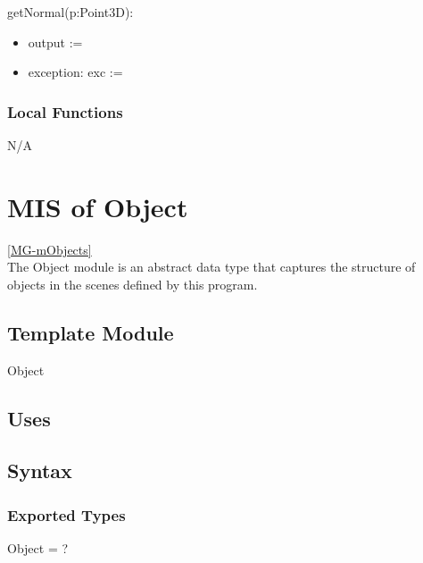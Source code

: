 \documentclass[12pt, titlepage]{article}
\begin{document}
\noindent getNormal(p:Point3D):
\begin{itemize}
	\item output := 
	\item exception: exc :=
\end{itemize}


\subsubsection{Local Functions}
N/A

\newpage

\section{MIS of Object} \ref{MG-mObjects} \\
The Object module is an abstract data type that captures the structure of 
objects in the scenes defined by this program.

\subsection{Template Module}
Object

\subsection{Uses}

\subsection{Syntax}
\subsubsection{Exported Types}
Object = ?
\end{document}

